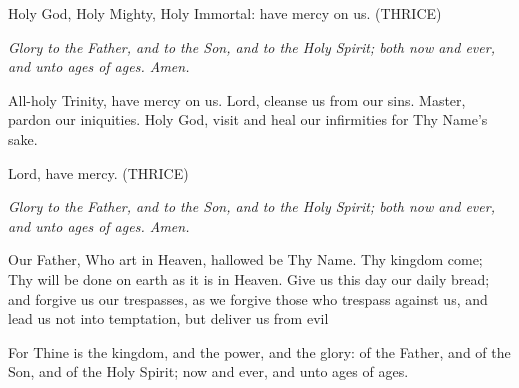 
Holy God, Holy Mighty, Holy Immortal: have mercy on us. (THRICE)

\vbox{}
\emph{Glory to the Father, and to the Son, and to the Holy Spirit; both now and ever, and
unto ages of ages. Amen.}

\vbox{}
All-holy Trinity, have mercy on us. Lord, cleanse us from our sins. Master, pardon
our iniquities. Holy God, visit and heal our infirmities for Thy Name’s sake.

\vbox{}
Lord, have mercy. (THRICE)

\vbox{}
\emph{Glory to the Father, and to the Son, and to the Holy Spirit; both now and ever, and
unto ages of ages. Amen.}

\vbox{}
Our Father, Who art in Heaven, hallowed be Thy Name. Thy kingdom come; Thy
will be done on earth as it is in Heaven. Give us this day our daily bread; and forgive
us our trespasses, as we forgive those who trespass against us, and lead us not into
temptation, but deliver us from evil

\begin{priest}
\item For Thine is the kingdom, and the power, and the glory:
    of the Father, and of the Son, and of the Holy Spirit; now and ever, and unto ages of ages.
\end{priest}